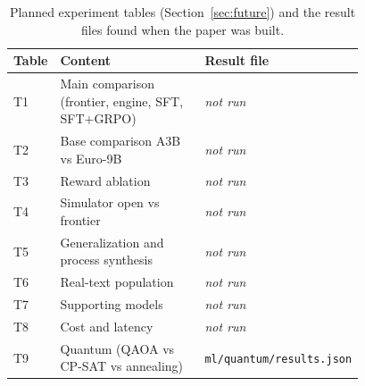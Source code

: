 \begin{table}[htbp]
\centering
\small
\caption{Planned experiment tables (Section~\ref{sec:future}) and the result files found when the paper was built.}
\label{tab:status}
\begin{tabular}{l>{\raggedright\arraybackslash}p{0.45\linewidth}>{\raggedright\arraybackslash}p{0.33\linewidth}}
\toprule
Table & Content & Result file \\
\midrule
T1 & Main comparison (frontier, engine, SFT, SFT+GRPO) & \emph{not run} \\
T2 & Base comparison A3B vs Euro-9B & \emph{not run} \\
T3 & Reward ablation & \emph{not run} \\
T4 & Simulator open vs frontier & \emph{not run} \\
T5 & Generalization and process synthesis & \emph{not run} \\
T6 & Real-text population & \emph{not run} \\
T7 & Supporting models & \emph{not run} \\
T8 & Cost and latency & \emph{not run} \\
T9 & Quantum (QAOA vs CP-SAT vs annealing) & \texttt{ml/quantum/results.json} \\
\bottomrule
\end{tabular}
\end{table}
